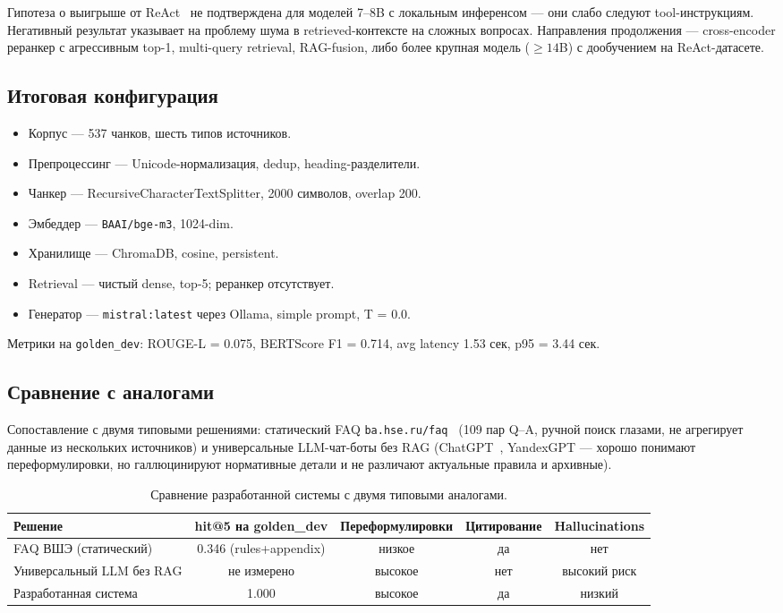 \documentclass[a4paper,12pt]{extarticle}
\begin{document}
Гипотеза о выигрыше от ReAct~\cite{react} не подтверждена для моделей 7--8B с локальным инференсом --- они слабо следуют tool-инструкциям. Негативный результат указывает на проблему шума в retrieved-контексте на сложных вопросах. Направления продолжения --- cross-encoder реранкер с агрессивным top-1, multi-query retrieval, RAG-fusion, либо более крупная модель ($\geq 14$B) с дообучением на ReAct-датасете.

\subsection{Итоговая конфигурация}
\begin{itemize}
    \item Корпус --- 537 чанков, шесть типов источников.
    \item Препроцессинг --- Unicode-нормализация, dedup, heading-разделители.
    \item Чанкер --- RecursiveCharacterTextSplitter, 2000 символов, overlap 200.
    \item Эмбеддер --- \texttt{BAAI/bge-m3}, 1024-dim.
    \item Хранилище --- ChromaDB, cosine, persistent.
    \item Retrieval --- чистый dense, top-5; реранкер отсутствует.
    \item Генератор --- \texttt{mistral:latest} через Ollama, simple prompt, T = 0.0.
\end{itemize}

Метрики на \texttt{golden\_dev}: ROUGE-L = 0.075, BERTScore F1 = 0.714, avg latency 1.53 сек, p95 = 3.44 сек.

\subsection{Сравнение с аналогами}

Сопоставление с двумя типовыми решениями: статический FAQ \texttt{ba.hse.ru/faq}~\cite{hsebachelor} (109 пар Q--A, ручной поиск глазами, не агрегирует данные из нескольких источников) и универсальные LLM-чат-боты без RAG (ChatGPT~\cite{gpt}, YandexGPT --- хорошо понимают переформулировки, но галлюцинируют нормативные детали и не различают актуальные правила и архивные).

\begin{table}[ht]
\caption{Сравнение разработанной системы с двумя типовыми аналогами.}
\label{tab:comparison}
\centering
\begin{tabular}{lcccc}
\toprule
Решение & hit@5 на golden\_dev & Переформулировки & Цитирование & Hallucinations \\
\midrule
FAQ ВШЭ (статический) & 0.346 (rules+appendix) & низкое & да & нет \\
Универсальный LLM без RAG & не измерено & высокое & нет & высокий риск \\
Разработанная система & 1.000 & высокое & да & низкий \\
\bottomrule
\end{tabular}
\end{table}
\end{document}
